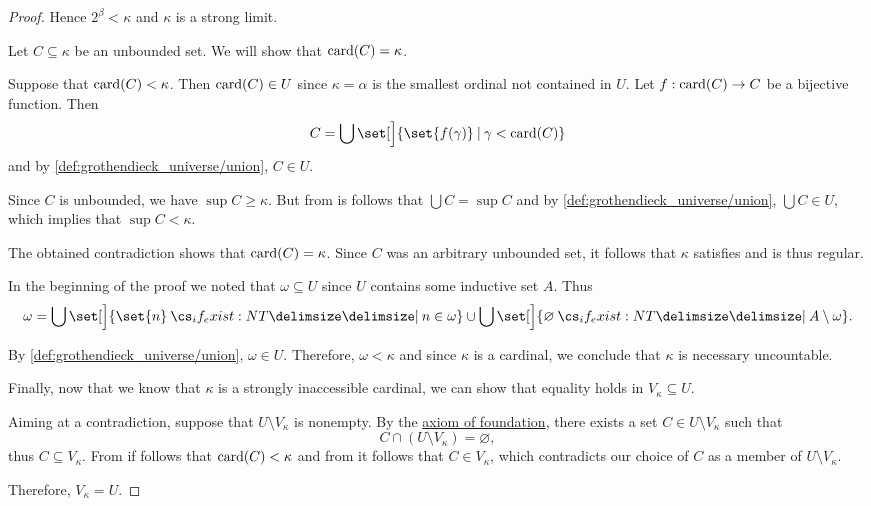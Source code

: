 \begin{proof}
  Hence \( 2^\beta < \kappa \) and \( \kappa \) is a strong limit.

   Let \( C \subseteq \kappa \) be an unbounded set. We will show that \( \operatorname{card}(C) = \kappa \).

  Suppose that \( \operatorname{card}(C) < \kappa \). Then \( \operatorname{card}(C) \in U \) since \( \kappa = \alpha \) is the smallest ordinal not contained in \( U \). Let \( f: \operatorname{card}(C) \to C \) be a bijective function. Then
  \begin{equation*}
    C = \bigcup\set[\Big]{ \set{ f(\gamma) } \given \gamma < \card(C) }
  \end{equation*}
  and by \ref{def:grothendieck_universe/union}, \( C \in U \).

  Since \( C \) is unbounded, we have \( \sup C \geq \kappa \). But from  is follows that \( \bigcup C = \sup C \) and by \ref{def:grothendieck_universe/union}, \( \bigcup C \in U \), which implies that \( \sup C < \kappa \).

  The obtained contradiction shows that \( \operatorname{card}(C) = \kappa \). Since \( C \) was an arbitrary unbounded set, it follows that \( \kappa \) satisfies  and is thus regular.

   In the beginning of the proof we noted that \( \omega \subseteq U \) since \( U \) contains some inductive set \( A \). Thus
  \begin{equation*}
    \omega = \bigcup\set[\Big]{ \set{ n } \given* n \in \omega } \cup \bigcup\set[\Big]{ \varnothing \given* A \setminus \omega }.
  \end{equation*}

  By \ref{def:grothendieck_universe/union}, \( \omega \in U \). Therefore, \( \omega < \kappa \) and since \( \kappa \) is a cardinal, we conclude that \( \kappa \) is necessary uncountable.

   Finally, now that we know that \( \kappa \) is a strongly inaccessible cardinal, we can show that equality holds in \( V_\kappa \subseteq U \).

  Aiming at a contradiction, suppose that \( U \setminus V_\kappa \) is nonempty. By the \hyperref[def:zfc/foundation]{axiom of foundation}, there exists a set \( C \in U \setminus V_\kappa \) such that
  \begin{equation*}
    C \cap (U \setminus V_\kappa) = \varnothing,
  \end{equation*}
  thus \( C \subseteq V_\kappa \). From  if follows that \( \operatorname{card}(C) < \kappa \) and from  it follows that \( C \in V_\kappa \), which contradicts our choice of \( C \) as a member of \( U \setminus V_\kappa \).

  Therefore, \( V_\kappa = U \).
\end{proof}

